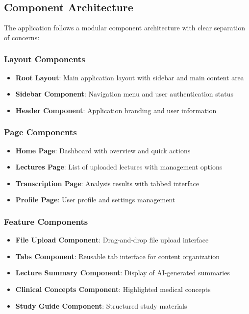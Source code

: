 \documentclass[12pt,a4paper]{article}
\begin{document}
\subsection{Component Architecture}

The application follows a modular component architecture with clear separation of concerns:

\subsubsection{Layout Components}
\begin{itemize}
    \item \textbf{Root Layout}: Main application layout with sidebar and main content area
    \item \textbf{Sidebar Component}: Navigation menu and user authentication status
    \item \textbf{Header Component}: Application branding and user information
\end{itemize}

\subsubsection{Page Components}
\begin{itemize}
    \item \textbf{Home Page}: Dashboard with overview and quick actions
    \item \textbf{Lectures Page}: List of uploaded lectures with management options
    \item \textbf{Transcription Page}: Analysis results with tabbed interface
    \item \textbf{Profile Page}: User profile and settings management
\end{itemize}

\subsubsection{Feature Components}
\begin{itemize}
    \item \textbf{File Upload Component}: Drag-and-drop file upload interface
    \item \textbf{Tabs Component}: Reusable tab interface for content organization
    \item \textbf{Lecture Summary Component}: Display of AI-generated summaries
    \item \textbf{Clinical Concepts Component}: Highlighted medical concepts
    \item \textbf{Study Guide Component}: Structured study materials
\end{itemize}
\end{document}
